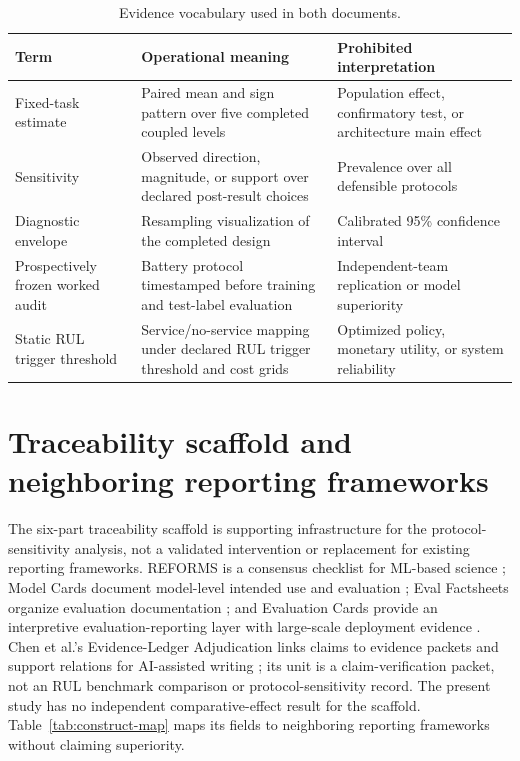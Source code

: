 \documentclass[11pt,a4paper]{article}
\begin{document}
\begin{table}[H]
\centering
\small
\caption{Evidence vocabulary used in both documents.}
\label{tab:evidence-vocabulary}
\begin{tabular}{@{}p{}p{}p{}@{}}
\toprule
Term & Operational meaning & Prohibited interpretation \\
\midrule
Fixed-task estimate & Paired mean and sign pattern over five completed coupled levels & Population effect, confirmatory test, or architecture main effect \\
Sensitivity & Observed direction, magnitude, or support over declared post-result choices & Prevalence over all defensible protocols \\
Diagnostic envelope & Resampling visualization of the completed design & Calibrated 95\% confidence interval \\
Prospectively frozen worked audit & Battery protocol timestamped before training and test-label evaluation & Independent-team replication or model superiority \\
Static RUL trigger threshold & Service/no-service mapping under declared RUL trigger threshold and cost grids & Optimized policy, monetary utility, or system reliability \\
\bottomrule
\end{tabular}
\end{table}

\section{Traceability scaffold and neighboring reporting frameworks}

The six-part traceability scaffold is supporting infrastructure for the protocol-sensitivity analysis, not a validated intervention or replacement for existing reporting frameworks. REFORMS is a consensus checklist for ML-based science \citep{Kapoor2024REFORMS}; Model Cards document model-level intended use and evaluation \citep{Mitchell2019ModelCards}; Eval Factsheets organize evaluation documentation \citep{Bordes2025EvalFactsheets}; and Evaluation Cards provide an interpretive evaluation-reporting layer with large-scale deployment evidence \citep{Ghosh2026EvaluationCards}. Chen et al.'s Evidence-Ledger Adjudication links claims to evidence packets and support relations for AI-assisted writing \citep{Chen2026EvidenceLedger}; its unit is a claim-verification packet, not an RUL benchmark comparison or protocol-sensitivity record. The present study has no independent comparative-effect result for the scaffold. Table~\ref{tab:construct-map} maps its fields to neighboring reporting frameworks without claiming superiority.
\end{document}
